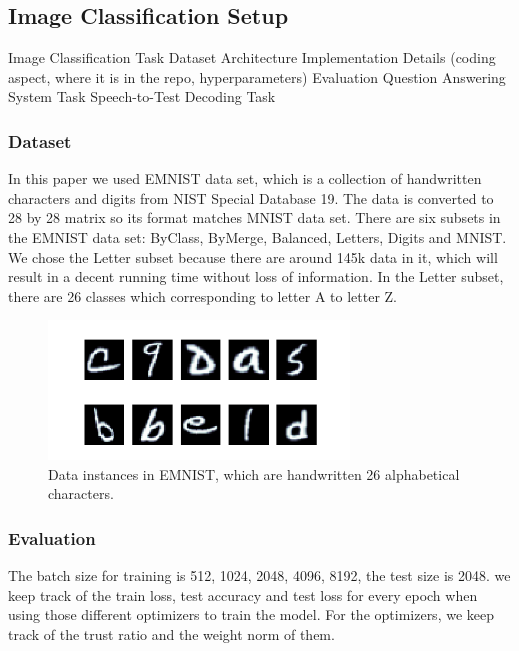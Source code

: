 \subsection{Image Classification Setup}

Image Classification Task
    Dataset
    Architecture
    Implementation Details (coding aspect, where it is in the repo, hyperparameters)
    Evaluation
Question Answering System Task
Speech-to-Test Decoding Task




\subsubsection{Dataset}

In this paper we used EMNIST \cite{emnist} data set, which is a collection of handwritten characters and digits from NIST Special Database 19. The data is converted to 28 by 28 matrix so its format matches MNIST data set. There are six subsets in the EMNIST data set: ByClass, ByMerge, Balanced, Letters, Digits and MNIST. We chose the Letter subset because there are around 145k data in it, which will result in a decent running time without loss of information. In the Letter subset, there are 26 classes which corresponding to letter A to letter Z.
\begin{figure}[htp]
    \centering
    \includegraphics[width=8cm]{img/EMNIST.png}
    \caption{Data instances in EMNIST, which are handwritten 26 alphabetical characters.}
    \label{fig:EMNIST}
\end{figure}



\subsubsection{Evaluation}



The batch size for training is {512, 1024, 2048, 4096, 8192}, the test size is 2048. we keep track of the train loss, test accuracy and test loss for every epoch when using those different optimizers to train the model. For the optimizers, we keep track of the trust ratio and the weight norm of them.


